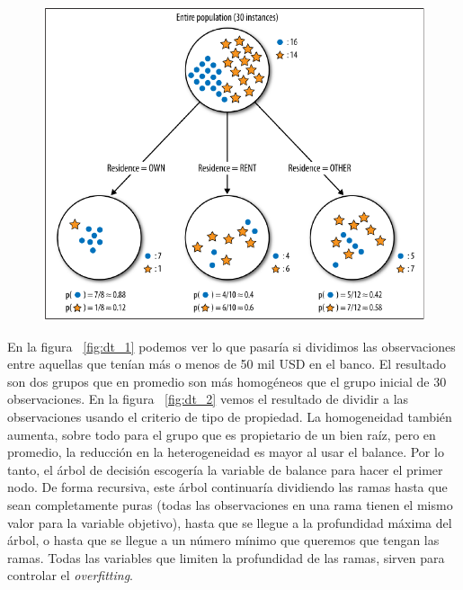 \documentclass[a4paper, 11pt]{article}
\begin{document}
\begin{enumerate}
\begin{figure}[hbt!]
     \includegraphics[scale = 0.6]{figures/dt_2}
\end{figure}

En la figura ~\ref{fig:dt_1} podemos ver lo que pasaría si dividimos las observaciones entre aquellas que tenían más o menos de 50 mil USD en el banco. El resultado son dos grupos que en promedio son más homogéneos que el grupo inicial de 30 observaciones. En la figura ~\ref{fig:dt_2}  vemos el resultado de dividir a las observaciones usando el criterio de tipo de propiedad. La homogeneidad también aumenta, sobre todo para el grupo que es propietario de un bien raíz, pero en promedio, la reducción en la heterogeneidad es mayor al usar el balance. Por lo tanto, el árbol de decisión escogería la variable de balance para hacer el primer nodo. De forma recursiva, este árbol continuaría dividiendo las ramas hasta que sean completamente puras (todas las observaciones en una rama tienen el mismo valor para la variable objetivo), hasta que se llegue a la profundidad máxima del árbol, o hasta que se llegue a un número mínimo que queremos que tengan las ramas. Todas las variables que limiten la profundidad de las ramas, sirven para controlar el \textit{overfitting}.


\end{enumerate}
\end{document}

